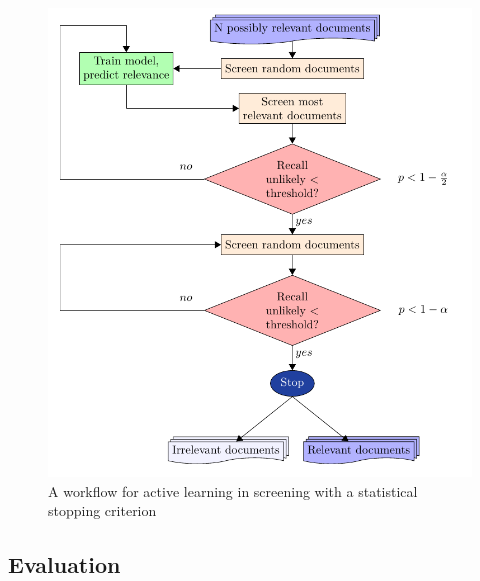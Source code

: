 \documentclass{bmcart}
\providecommand{\DIFaddbeginFL}{} %
\providecommand{\DIFaddendFL}{} %
\providecommand{\DIFdelbeginFL}{} %
\providecommand{\DIFdelendFL}{} %
\newcommand{\DIFscaledelfig}{0.5}
\newlength{\DIFdelgraphicswidth} %
\newlength{\DIFdelgraphicsheight} %
\newcommand{\DIFaddincludegraphics}[2][]{{\color{blue}\fbox{\DIFOincludegraphics[#1]{#2}}}} %
\newcommand{\DIFdelincludegraphics}[2][]{%
\sbox{\DIFdelgraphicsbox}{\DIFOincludegraphics[#1]{#2}}%
\settoboxwidth{\DIFdelgraphicswidth}{\DIFdelgraphicsbox} %
\settoboxtotalheight{\DIFdelgraphicsheight}{\DIFdelgraphicsbox} %
\scalebox{\DIFscaledelfig}{%
\parbox[b]{\DIFdelgraphicswidth}{\usebox{\DIFdelgraphicsbox}\\[-\baselineskip] \rule{\DIFdelgraphicswidth}{0em}}\llap{\resizebox{\DIFdelgraphicswidth}{\DIFdelgraphicsheight}{%
\setlength{\unitlength}{\DIFdelgraphicswidth}%
\begin{picture}(1,1)%
\thicklines\linethickness{2pt} %
{\color[rgb]{1,0,0}\put(0,0){\framebox(1,1){}}}%
{\color[rgb]{1,0,0}\put(0,0){\line( 1,1){1}}}%
{\color[rgb]{1,0,0}\put(0,1){\line(1,-1){1}}}%
\end{picture}%
}\hspace*{3pt}}} %
} %
\DeclareRobustCommand{\DIFaddbeginFL}{\DIFOaddbeginFL \let\includegraphics\DIFaddincludegraphics} %
\DeclareRobustCommand{\DIFaddendFL}{\DIFOaddendFL \let\includegraphics\DIFOincludegraphics} %
\DeclareRobustCommand{\DIFdelbeginFL}{\DIFOdelbeginFL \let\includegraphics\DIFdelincludegraphics} %
\DeclareRobustCommand{\DIFdelendFL}{\DIFOaddendFL \let\includegraphics\DIFOincludegraphics} %
\begin{document}
	
	\medskip

	\begin{figure}
		\DIFdelbeginFL %
\DIFdelendFL \DIFaddbeginFL \includegraphics[width=0.7\linewidth]{2_figs_flow.pdf}
		\DIFaddendFL \caption{A workflow for active learning in screening with a statistical stopping criterion}
		\label{flow}
	\end{figure}

	\subsection*{Evaluation}
\end{document}
